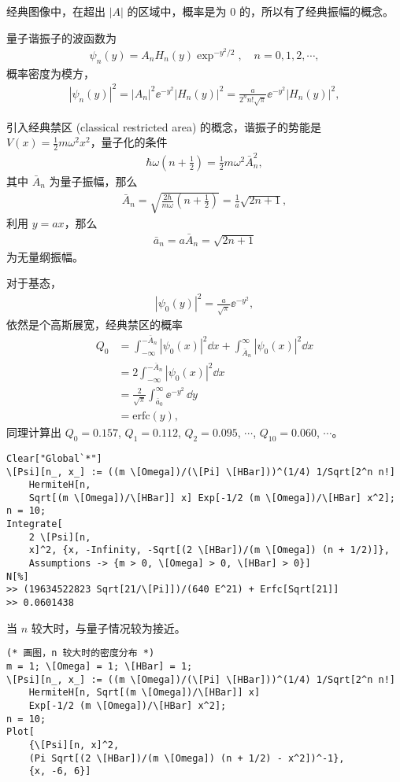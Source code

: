 经典图像中，在超出 $|A|$ 的区域中，概率是为 0 的，所以有了经典振幅的概念。

量子谐振子的波函数为
\begin{align}
    \psi_n(y) = A_n H_n(y) \exp^{-y^2/2}, \quad n=0,1,2,\cdots,
\end{align}
概率密度为模方，
\begin{align}
    |\psi_n(y)|^2 = |A_n|^2 \ee^{-y^2} |H_n (y)|^2 
    = \frac{a}{2^n n! \sqrt{\pi}} \ee^{-y^2} |H_n(y)|^2,
\end{align}

引入经典禁区 (classical restricted area) 的概念，谐振子的势能是 $V(x) = \frac 12 m\omega^2 x^2$，量子化的条件
\begin{align}
    \hbar\omega \left(n+\frac12\right) = \frac12 m\omega^2 \bar A_n^2,
\end{align}
其中 $\bar A_n$ 为量子振幅，那么
\begin{align}
    \bar A_n = \sqrt{\frac{2\hbar}{m\omega} \left(n+\frac12\right)} = \frac1a \sqrt{2n+1},
\end{align}
利用 $y=ax$，那么
\begin{align}
    \bar a_n = a \bar A_n = \sqrt{2n+1}
\end{align}
为无量纲振幅。

对于基态，
\begin{align}
    |\psi_0(y)|^2 = \frac{a}{\sqrt{\pi}} \ee^{-y^2},
\end{align}
依然是个高斯展宽，经典禁区的概率
\begin{align}
    Q_0 &= \int_{-\infty}^{-\bar A_n} |\psi_0(x)|^2 \dd x + \int_{\bar A_n}^{\infty} |\psi_0(x)|^2 \dd x \\
    &= 2 \int_{-\infty}^{-\bar A_n} |\psi_0(x)|^2 \dd x \\
    &= \frac{2}{\sqrt{\pi}} \int_{\bar a_0}^{\infty} \ee^{-y^2}\,\dd y \\
    &= \mathrm{erfc}(y),
\end{align}
同理计算出 $Q_0 = 0.157$, $Q_1 = 0.112$, $Q_2 = 0.095$, $\cdots$, $Q_{10} = 0.060$, $\cdots$。
\begin{lstlisting}
Clear["Global`*"]
\[Psi][n_, x_] := ((m \[Omega])/(\[Pi] \[HBar]))^(1/4) 1/Sqrt[2^n n!]
    HermiteH[n, 
    Sqrt[(m \[Omega])/\[HBar]] x] Exp[-1/2 (m \[Omega])/\[HBar] x^2];
n = 10;
Integrate[
    2 \[Psi][n, 
    x]^2, {x, -Infinity, -Sqrt[(2 \[HBar])/(m \[Omega]) (n + 1/2)]}, 
    Assumptions -> {m > 0, \[Omega] > 0, \[HBar] > 0}]
N[%]
>> (19634522823 Sqrt[21/\[Pi]])/(640 E^21) + Erfc[Sqrt[21]]
>> 0.0601438
\end{lstlisting}

当 $n$ 较大时，与量子情况较为接近。
\begin{lstlisting}
(* 画图，n 较大时的密度分布 *)
m = 1; \[Omega] = 1; \[HBar] = 1;
\[Psi][n_, x_] := ((m \[Omega])/(\[Pi] \[HBar]))^(1/4) 1/Sqrt[2^n n!]
    HermiteH[n, Sqrt[(m \[Omega])/\[HBar]] x] 
    Exp[-1/2 (m \[Omega])/\[HBar] x^2];
n = 10;
Plot[
    {\[Psi][n, x]^2, 
    (Pi Sqrt[(2 \[HBar])/(m \[Omega]) (n + 1/2) - x^2])^-1}, 
    {x, -6, 6}]
\end{lstlisting}

